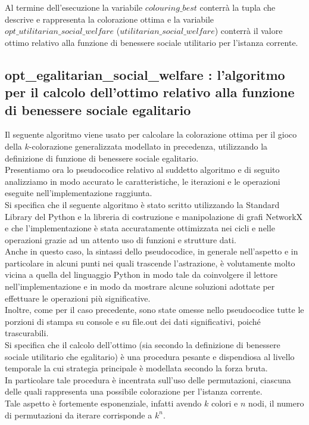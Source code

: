 Al termine dell'esecuzione la variabile $colouring\_best$ conterrà la tupla che descrive e rappresenta la colorazione ottima e la variabile \\
$opt\_utilitarian\_social\_welfare$ ($utilitarian\_social\_welfare$) conterrà il valore ottimo relativo alla funzione di benessere sociale utilitario per l'istanza corrente.\\

\newpage
\subsection{opt\_egalitarian\_social\_welfare : l'algoritmo per il calcolo dell'ottimo relativo alla funzione di benessere sociale egalitario}
\justify
Il seguente algoritmo viene usato per calcolare la colorazione ottima per il gioco della \(k\)-colorazione generalizzata modellato in precedenza, utilizzando la definizione di funzione di benessere sociale egalitario.\\

Presentiamo ora lo pseudocodice relativo al suddetto algoritmo e di seguito analizziamo in modo accurato le caratteristiche, le iterazioni e le operazioni eseguite nell'implementazione raggiunta.\\

Si specifica che il seguente algoritmo è stato scritto utilizzando la Standard Library del Python e la libreria di costruzione e manipolazione di grafi NetworkX e che l'implementazione è stata accuratamente ottimizzata nei cicli e nelle operazioni grazie ad un attento uso di funzioni e strutture dati.\\

Anche in questo caso, la sintassi dello pseudocodice, in generale nell'aspetto e in particolare in alcuni punti nei quali trascende l'astrazione, è volutamente molto vicina a quella del linguaggio Python in modo tale da coinvolgere il lettore nell'implementazione e in modo da mostrare alcune soluzioni adottate per effettuare le operazioni più significative.\\

Inoltre, come per il caso precedente, sono state omesse nello pseudocodice tutte le porzioni di stampa su console e su file.out dei dati significativi, poiché trascurabili.\\

Si specifica che il calcolo dell'ottimo (sia secondo la definizione di benessere sociale utilitario che egalitario) è una procedura pesante e dispendiosa al livello temporale la cui strategia principale è modellata secondo la forza bruta.\\
In particolare tale procedura è incentrata sull'uso delle permutazioni, ciascuna delle quali rappresenta una possibile colorazione per l'istanza corrente.\\
Tale aspetto è fortemente esponenziale, infatti avendo \(k\) colori e \(n\) nodi, il numero di permutazioni da iterare corrisponde a \(k^n\).\\

